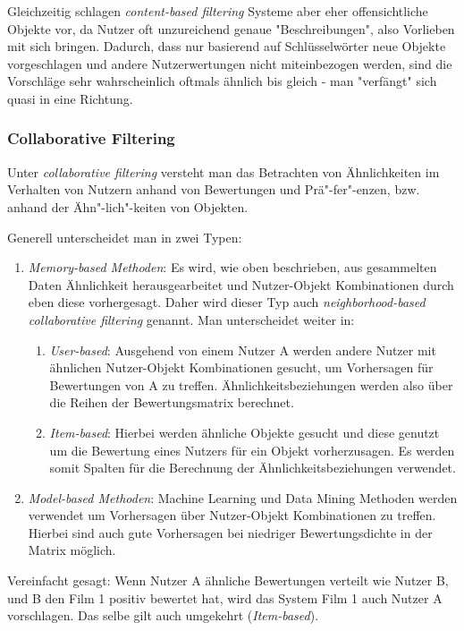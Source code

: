 Gleichzeitig schlagen \textit{content-based filtering} Systeme aber eher offensichtliche Objekte vor, da Nutzer oft unzureichend genaue "Beschreibungen", also Vorlieben mit sich bringen. Dadurch, dass nur basierend auf Schlüsselwörter neue Objekte vorgeschlagen und andere Nutzerwertungen nicht miteinbezogen werden, sind die Vorschläge sehr wahrscheinlich oftmals ähnlich bis gleich - man "verfängt" sich quasi in eine Richtung.\cite{aggarwal2016}

\subsubsection{Collaborative Filtering}
Unter \textit{collaborative filtering} versteht man das Betrachten von Ähnlichkeiten im Verhalten von Nutzern anhand von Bewertungen und Prä"-fer"-enzen, bzw. anhand der Ähn"-lich"-keiten von Objekten.

Generell unterscheidet man in zwei Typen:\cite{aggarwal2016}

\begin{enumerate}		
	\item \textit{Memory-based Methoden}: Es wird, wie oben beschrieben, aus gesammelten Daten Ähnlichkeit herausgearbeitet und Nutzer-Objekt Kombinationen durch eben diese vorhergesagt. Daher wird dieser Typ auch \textit{neighborhood-based collaborative filtering} genannt. Man unterscheidet weiter in:
	\begin{enumerate}
		\item \textit{User-based}: Ausgehend von einem Nutzer A werden andere Nutzer mit ähnlichen Nutzer-Objekt Kombinationen gesucht, um Vorhersagen für Bewertungen von A zu treffen. Ähnlichkeitsbeziehungen werden also über die Reihen der Bewertungsmatrix berechnet.
		\item \textit{Item-based}: Hierbei werden ähnliche Objekte gesucht und diese genutzt um die Bewertung eines Nutzers für ein Objekt vorherzusagen. Es werden somit Spalten für die Berechnung der Ähnlichkeitsbeziehungen verwendet.
	\end{enumerate}
	\item \textit{Model-based Methoden}: Machine Learning und Data Mining Methoden werden verwendet um Vorhersagen über Nutzer-Objekt Kombinationen zu treffen. Hierbei sind auch gute Vorhersagen bei niedriger Bewertungsdichte in der Matrix möglich.
\end{enumerate}

Vereinfacht gesagt: Wenn Nutzer A ähnliche Bewertungen verteilt wie Nutzer B, und B den Film 1 positiv bewertet hat, wird das System Film 1 auch Nutzer A vorschlagen. Das selbe gilt auch umgekehrt (\textit{Item-based}).

